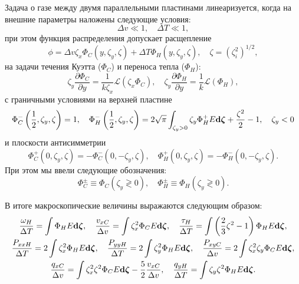 \documentclass[a4paper,12pt]{article}
\newcommand{\pder}[2][]{\frac{\partial#1}{\partial#2}}
\begin{document}
Задача о газе между двумя параллельными пластинами линеаризуется,
когда на внешние параметры наложены следующие условия:
\begin{equation}\label{eq:weak_perturbation}
    \Delta{v}\ll 1, \quad \Delta{T}\ll 1,
\end{equation}
при этом функция распределения допускает расщепление
\begin{equation}\label{eq:linear_solution}
    \phi = \Delta{v} \zeta_x \Phi_C(y,\zeta_y,\zeta) + \Delta{T} \Phi_H(y,\zeta_y,\zeta),
    \quad \zeta = (\zeta_i^2)^{1/2},
\end{equation}
на задачи течения Куэтта (\(\Phi_C\)) и переноса тепла (\(\Phi_H\)):
\begin{equation}\label{eq:linear_equations}
    \zeta_y \pder[\Phi_C]{y} = \frac1{k\zeta_x}\mathcal{L}(\zeta_x\Phi_C), \quad
    \zeta_y \pder[\Phi_H]{y} = \frac1{k}\mathcal{L}(\Phi_H),
\end{equation}
с граничными условиями на верхней пластине
\begin{equation}\label{eq:linear_bc1}
    \Phi_C^- \left(\frac12,\zeta_y,\zeta\right) = 1, \quad
    \Phi_H^- \left(\frac12,\zeta_y,\zeta\right) = 2\sqrt\pi\int_{\zeta_y>0}\zeta_y\Phi_H^+ E\boldsymbol{\mathrm{d}\zeta} + \frac{\zeta^2}2-1, \quad
    \zeta_y < 0
\end{equation}
и плоскости антисимметрии
\begin{equation}\label{eq:linear_bc2}
    \Phi_C^+ (0,\zeta_y,\zeta) = -\Phi_C^- (0,-\zeta_y,\zeta), \quad
    \Phi_H^+ (0,\zeta_y,\zeta) = -\Phi_H^- (0,-\zeta_y,\zeta).
\end{equation}
При этом мы ввели следующие обозначения:
\begin{equation}\label{eq:linear_pm_phi}
    \Phi_C^\pm \equiv \Phi_C (\zeta_y \gtrless 0), \quad
    \Phi_H^\pm \equiv \Phi_H (\zeta_y \gtrless 0).
\end{equation}

В итоге макроскопические величины выражаются следующим образом:
\begin{gather*}
    \frac{\omega_{H}}{\Delta{T}} = \int \Phi_H E\boldsymbol{\mathrm{d}\zeta}, \quad
    \frac{v_{xC}}{\Delta{v}} = \int \zeta_x^2 \Phi_C E\boldsymbol{\mathrm{d}\zeta}, \quad
    \frac{\tau_{H}}{\Delta{T}} = \int \left(\frac23\zeta^2-1\right) \Phi_H E\boldsymbol{\mathrm{d}\zeta}, \\
    \frac{P_{xxH}}{\Delta{T}} = 2\int \zeta_x^2 \Phi_H E\boldsymbol{\mathrm{d}\zeta}, \quad
    \frac{P_{yyH}}{\Delta{T}} = 2\int \zeta_y^2 \Phi_H E\boldsymbol{\mathrm{d}\zeta}, \quad
    \frac{P_{xyC}}{\Delta{v}} = 2\int \zeta_x^2 \zeta_y \Phi_C E\boldsymbol{\mathrm{d}\zeta}, \\
    \frac{q_{xC}}{\Delta{v}} = \int \zeta_x^2 \zeta^2 \Phi_C E\boldsymbol{\mathrm{d}\zeta} - \frac52 \frac{v_{xC}}{\Delta{v}}, \quad
    \frac{q_{yH}}{\Delta{T}} = \int \zeta_y \zeta^2 \Phi_H E\boldsymbol{\mathrm{d}\zeta}.
\end{gather*}
\end{document}

